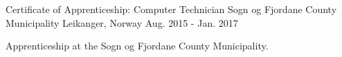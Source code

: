 \begin{cventries}
  \cventry
    {Certificate of Apprenticeship: Computer Technician} %
    {Sogn og Fjordane County Municipality} %
    {Leikanger, Norway} %
    {Aug. 2015 - Jan. 2017} %
    {
      \begin{cvitems} %
        \item {Apprenticeship at the Sogn og Fjordane County Municipality.}
      \end{cvitems}
    }

\end{cventries}
